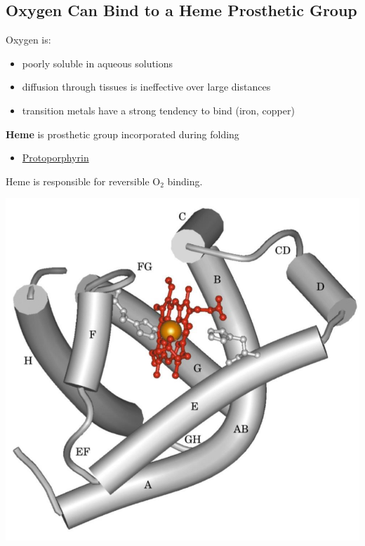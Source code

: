 \documentclass[10pt]{article}
\begin{document}
\subsection*{Oxygen Can Bind to a Heme Prosthetic Group}
Oxygen is:
\begin{itemize}
    \item poorly soluble in aqueous solutions
    \item diffusion through tissues is ineffective over large distances
    \item transition metals have a strong tendency to bind (iron, copper)
\end{itemize}
\textbf{Heme} is prosthetic group incorporated during folding
\begin{itemize}
    \item \underline{Protoporphyrin}
\end{itemize}
Heme is responsible for reversible O$_2$ binding.
\begin{center}
    \includegraphics*[scale=0.4]{L2_1.png}
\end{center}
\end{document}
